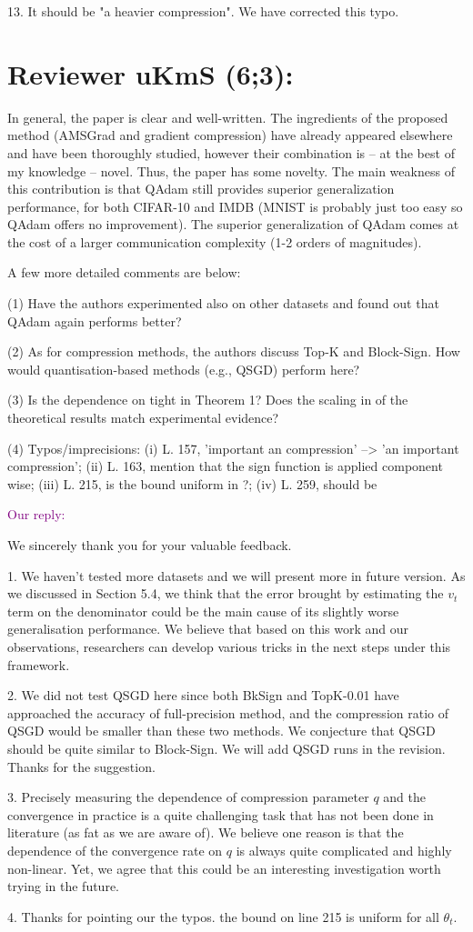 \documentclass{article}
\begin{document}
13. It should be "a heavier compression". We have corrected this typo.


\section{Reviewer uKmS (6;3):}


In general, the paper is clear and well-written. The ingredients of the proposed method (AMSGrad and gradient compression) have already appeared elsewhere and have been thoroughly studied, however their combination is -- at the best of my knowledge -- novel. Thus, the paper has some novelty. The main weakness of this contribution is that QAdam still provides superior generalization performance, for both CIFAR-10 and IMDB (MNIST is probably just too easy so QAdam offers no improvement). The superior generalization of QAdam comes at the cost of a larger communication complexity (1-2 orders of magnitudes).

A few more detailed comments are below:

(1) Have the authors experimented also on other datasets and found out that QAdam again performs better?

(2) As for compression methods, the authors discuss Top-K and Block-Sign. How would quantisation-based methods (e.g., QSGD) perform here?

(3) Is the dependence on  tight in Theorem 1? Does the scaling in  of the theoretical results match experimental evidence?

(4) Typos/imprecisions: (i) L. 157, 'important an compression' --> 'an important compression'; (ii) L. 163, mention that the sign function is applied component wise; (iii) L. 215, is the bound uniform in ?; (iv) L. 259,  should be 



\textcolor{purple}{Our reply:}

We sincerely thank you for your valuable feedback. 

1. We haven't tested more datasets and we will present more in future version. As we discussed in Section 5.4, we think that the error brought by estimating the $v_t$ term on the denominator could be the main cause of its slightly worse generalisation performance. We believe that based on this work and our observations, researchers can develop various tricks in the next steps under this framework.

2. We did not test QSGD here since both BkSign and TopK-0.01 have approached the accuracy of full-precision method, and the compression ratio of QSGD would be smaller than these two methods. We conjecture that QSGD should be quite similar to Block-Sign. We will add QSGD runs in the revision. Thanks for the suggestion.

3. Precisely measuring the dependence of compression parameter $q$ 
and the convergence in practice is a quite challenging task that has not been done in literature (as fat as we are aware of). We believe one reason is that the dependence of the convergence rate on $q$ is always quite complicated and highly non-linear. Yet, we agree that this could be an interesting investigation worth trying in the future. 

4. Thanks for pointing our the typos. the bound on line 215 is uniform for all $\theta_t$.
\end{document}
